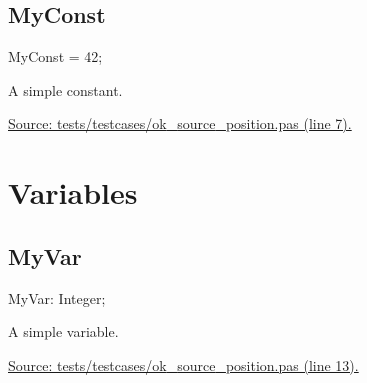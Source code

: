 \documentclass{report}
\newif\ifpdf
\begin{document}
\subsection*{MyConst}
\fi
\label{ok_source_position-MyConst}
\begin{list}{}{
\setlength{\itemindent}{0cm}
\setlength{\listparindent}{0cm}
\setlength{\leftmargin}{\evensidemargin}
\addtolength{\leftmargin}{\tmplength}
\settowidth{\labelsep}{X}
\addtolength{\leftmargin}{\labelsep}
\setlength{\labelwidth}{\tmplength}
}
\item[\textbf{Declaration}\hfill]
\ifpdf
\begin{flushleft}
\fi
\begin{ttfamily}
MyConst = 42;\end{ttfamily}

\ifpdf
\end{flushleft}
\fi

\par
\item[\textbf{Description}]
A simple constant.\par
\href{https://github.com/pasdoc/pasdoc/blob/master/tests/testcases/ok_source_position.pas#L7}{Source: tests/testcases/ok{\_}source{\_}position.pas (line 7).}

\end{list}
\section{Variables}
\ifpdf
\subsection*{\large{\textbf{MyVar}}\normalsize\hspace{1ex}\hrulefill}
\else
\subsection*{MyVar}
\fi
\label{ok_source_position-MyVar}
\begin{list}{}{
\setlength{\itemindent}{0cm}
\setlength{\listparindent}{0cm}
\setlength{\leftmargin}{\evensidemargin}
\addtolength{\leftmargin}{\tmplength}
\settowidth{\labelsep}{X}
\addtolength{\leftmargin}{\labelsep}
\setlength{\labelwidth}{\tmplength}
}
\item[\textbf{Declaration}\hfill]
\ifpdf
\begin{flushleft}
\fi
\begin{ttfamily}
MyVar: Integer;\end{ttfamily}

\ifpdf
\end{flushleft}
\fi

\par
\item[\textbf{Description}]
A simple variable.\par
\href{https://github.com/pasdoc/pasdoc/blob/master/tests/testcases/ok_source_position.pas#L13}{Source: tests/testcases/ok{\_}source{\_}position.pas (line 13).}

\end{list}
\end{document}
